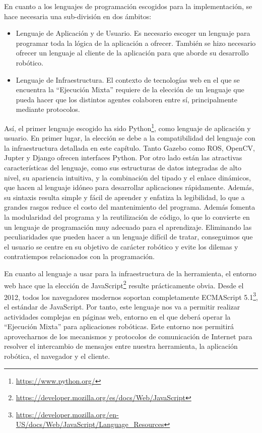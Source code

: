En cuanto a los lenguajes de programación escogidos para la implementación, se hace necesaria una sub-división en dos ámbitos:

\begin{itemize}
    \item Lenguaje de Aplicación y de Usuario. Es necesario escoger un lenguaje para programar toda la lógica de la aplicación a ofrecer. También se hizo necesario ofrecer un lenguaje al cliente de la aplicación para que aborde su desarrollo robótico.
    \item Lenguaje de Infraestructura. El contexto de tecnologías web en el que se encuentra la ``Ejecución Mixta'' requiere de la elección de un lenguaje que pueda hacer que los distintos agentes colaboren entre sí, principalmente mediante protocolos.
\end{itemize}

Así, el primer lenguaje escogido ha sido Python\footnote{\url{https://www.python.org/}}, como lenguaje de aplicación y usuario. En primer lugar, la elección se debe a la compatibilidad del lenguaje con la infraestructura detallada en este capítulo. Tanto Gazebo como ROS, OpenCV, Jupter y Django ofrecen interfaces Python. Por otro lado están las atractivas características del lenguaje, como sus estructuras de datos integradas de alto nivel, su apariencia intuitiva, y la combinación del tipado y el enlace dinámicos, que hacen al lenguaje idóneo para desarrollar aplicaciones rápidamente. Además, su sintaxis resulta simple y fácil de aprender y enfatiza la legibilidad, lo que a grandes rasgos reduce el costo del mantenimiento del programa. Además fomenta la modularidad del programa y la reutilización de código, lo que lo convierte en un lenguaje de programación muy adecuado para el aprendizaje. Eliminando las peculiaridades que pueden hacer a un lenguaje difícil de tratar, conseguimos que el usuario se centre en su objetivo de carácter robótico y evite los dilemas y contratiempos relacionados con la programación.

En cuanto al lenguaje a usar para la infraestructura de la herramienta, el entorno web hace que la elección de JavaScript\footnote{\url{https://developer.mozilla.org/es/docs/Web/JavaScript}} resulte prácticamente obvia. Desde el 2012, todos los navegadores modernos soportan completamente ECMAScript 5.1\footnote{\url{https://developer.mozilla.org/en-US/docs/Web/JavaScript/Language_Resources}}, el estándar de JavaScript. Por tanto, este lenguaje nos va a permitir realizar actividades complejas en páginas web, entorno en el que deberá operar la ``Ejecución Mixta'' para aplicaciones robóticas. Este entorno nos permitirá aprovecharnos de los mecanismos y protocolos de comunicación de Internet para resolver el intercambio de mensajes entre nuestra herramienta, la aplicación robótica, el navegador y el cliente.

